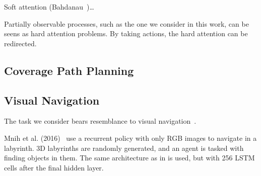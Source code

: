 

\cite{minut_mahadevan_2001}

\cite{mnih_attention_2014}

Soft attention (Bahdanau~\cite{bahdanau_attention_2016})\dots

Partially observable processes, such as the one we consider in this work, can be seens as hard attention problems.
By taking actions, the hard attention can be redirected.

\subsection{Coverage Path Planning}

\cite{galceran_carreras_2013} %

\cite{krishna_tetromino_2020} %

\subsection{Visual Navigation}

The task we consider bears resemblance to visual navigation~\cite{zeng_survey_2020}. %





Mnih et al. (2016)~\cite{mnih_asynchronous_2016} use a recurrent policy with only RGB images to navigate in a labyrinth.
3D labyrinths are randomly generated, and an agent is tasked with finding objects in them.
The same architecture as in \cite{mnih_human_2015} is used, but with 256 LSTM cells after the final hidden layer.

